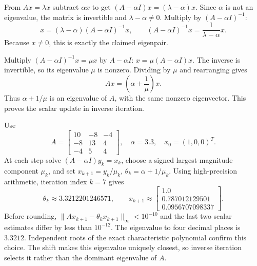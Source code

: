 From $Ax=\lambda x$ subtract $\alpha x$ to get
$(A-\alpha I)x=(\lambda-\alpha)x$.
Since $\alpha$ is not an eigenvalue, the matrix is invertible and
$\lambda-\alpha\ne0$. Multiply by $(A-\alpha I)^{-1}$:
\[x=(\lambda-\alpha)(A-\alpha I)^{-1}x,
\qquad (A-\alpha I)^{-1}x=\frac1{\lambda-\alpha}x.\]
Because $x\ne0$, this is exactly the claimed eigenpair.

Multiply $(A-\alpha I)^{-1}x=\mu x$ by $A-\alpha I$:
$x=\mu(A-\alpha I)x$.
The inverse is invertible, so its eigenvalue $\mu$ is nonzero.
Dividing by $\mu$ and rearranging gives
\[Ax=\left(\alpha+\frac1\mu\right)x.\]
Thus $\alpha+1/\mu$ is an eigenvalue of $A$, with the same
nonzero eigenvector. This proves the scalar update in inverse iteration.

Use
\[A=\left[\begin{matrix}10 & -8 & -4\\-8 & 13 & 4\\-4 & 5 & 4\end{matrix}\right],\quad \alpha=3.3,\quad x_0=(1,0,0)^T.\]
At each step solve $(A-\alpha I)y_k=x_k$, choose a signed
largest-magnitude component $\mu_k$, and set
$x_{k+1}=y_k/\mu_k$, $\theta_k=\alpha+1/\mu_k$.
Using high-precision arithmetic, iteration index $k=7$ gives
\[\theta_k\approx3.3212201246571,\qquad
x_{k+1}\approx\left[\begin{matrix}1.0\\0.787012129501\\0.0956707098337\end{matrix}\right].\]
Before rounding, $\|Ax_{k+1}-\theta_kx_{k+1}\|_\infty<10^{-10}$
and the last two scalar estimates differ by less than $10^{-12}$.
The eigenvalue to four decimal places is $\boxed{3.3212}$.
Independent roots of the exact characteristic polynomial confirm this
choice. The shift makes this eigenvalue uniquely closest, so inverse
iteration selects it rather than the dominant eigenvalue of $A$.

